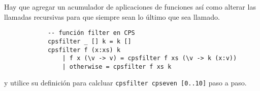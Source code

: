 \documentclass{article}
\newcommand{\tx}[1]{\texttt{#1}}
\begin{document}
\begin{enumerate}
        Hay que agregar un acumulador de aplicaciones de funciones así como 
        alterar las llamadas recursivas para que siempre sean lo último que sea 
        llamado.

        \begin{verbatim}
            -- función filter en CPS
            cpsfilter _ [] k = k []
            cpsfilter f (x:xs) k 
                | f x (\v -> v) = cpsfilter f xs (\v -> k (x:v))
                | otherwise = cpsfilter f xs k
        \end{verbatim}

        y utilice su definición para calcluar \tx{cpsfilter cpseven [0..10]} 
        paso a paso.
        
    \end{enumerate}
\end{document}
